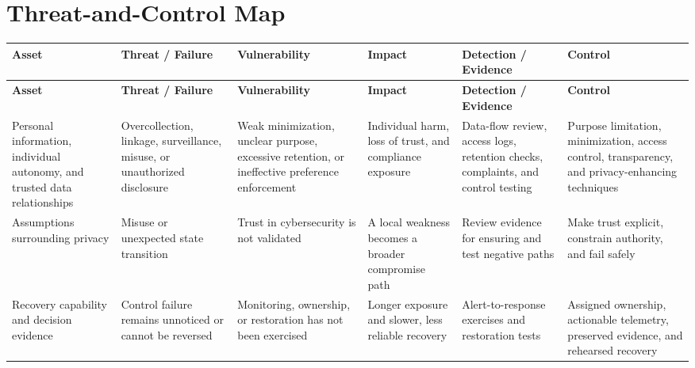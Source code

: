 \documentclass[11pt]{article}
\begin{document}
\section*{Threat-and-Control Map}
\begingroup\scriptsize\setlength{\tabcolsep}{2pt}
\begin{longtable}{>{\RaggedRight\arraybackslash}p{}>{\RaggedRight\arraybackslash}p{}>{\RaggedRight\arraybackslash}p{}>{\RaggedRight\arraybackslash}p{}>{\RaggedRight\arraybackslash}p{}>{\RaggedRight\arraybackslash}p{}}
\toprule\rowcolor{Navy}\color{white}\textbf{Asset} & \color{white}\textbf{Threat / Failure} & \color{white}\textbf{Vulnerability} & \color{white}\textbf{Impact} & \color{white}\textbf{Detection / Evidence} & \color{white}\textbf{Control}\\\midrule
\endfirsthead
\toprule\rowcolor{Navy}\color{white}\textbf{Asset} & \color{white}\textbf{Threat / Failure} & \color{white}\textbf{Vulnerability} & \color{white}\textbf{Impact} & \color{white}\textbf{Detection / Evidence} & \color{white}\textbf{Control}\\\midrule
\endhead
Personal information, individual autonomy, and trusted data relationships & Overcollection, linkage, surveillance, misuse, or unauthorized disclosure & Weak minimization, unclear purpose, excessive retention, or ineffective preference enforcement & Individual harm, loss of trust, and compliance exposure & Data-flow review, access logs, retention checks, complaints, and control testing & Purpose limitation, minimization, access control, transparency, and privacy-enhancing techniques\\\midrule
Assumptions surrounding privacy & Misuse or unexpected state transition & Trust in cybersecurity is not validated & A local weakness becomes a broader compromise path & Review evidence for ensuring and test negative paths & Make trust explicit, constrain authority, and fail safely\\\midrule
Recovery capability and decision evidence & Control failure remains unnoticed or cannot be reversed & Monitoring, ownership, or restoration has not been exercised & Longer exposure and slower, less reliable recovery & Alert-to-response exercises and restoration tests & Assigned ownership, actionable telemetry, preserved evidence, and rehearsed recovery\\\midrule
\bottomrule
\end{longtable}
\endgroup
\end{document}
